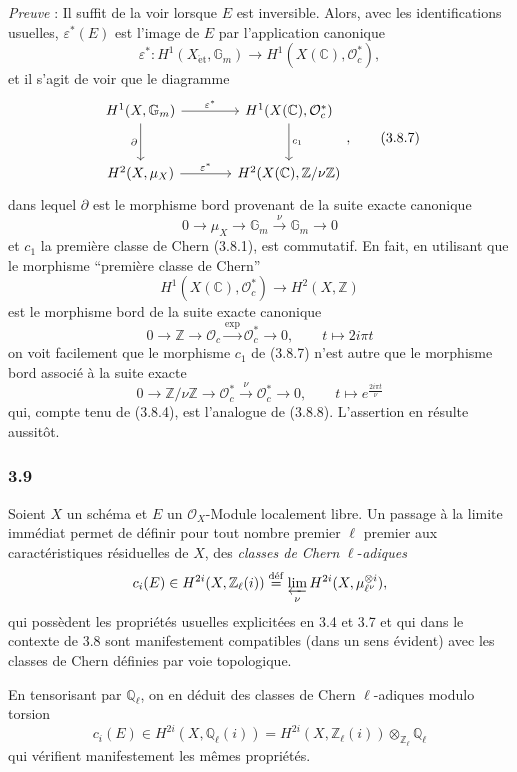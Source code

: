 \documentclass[11pt]{article}
\providecommand{\et}{\mathrm{\acute{e}t}}
\providecommand{\et}{\acute{e}t}
\begin{document}
\emph{Preuve} : Il suffit de la voir lorsque $E$ est inversible. Alors, avec les identifications usuelles, $\varepsilon^*(E)$ est l'image de $E$ par l'application canonique
\[
\varepsilon^*:H^1(X_{\et},\mathbb G_m)\to H^1(X(\mathbb C),\mathcal O_c^*),
\tag{3.8.6}
\]
et il s'agit de voir que le diagramme
\[
\begin{tikzcd}[column sep=large,row sep=large]
H^1(X,\mathbb G_m) \arrow[r,"\varepsilon^*"] \arrow[d,"\partial"'] &
H^1(X(\mathbb C),\mathcal O_c^*) \arrow[d,"c_1"]\\
H^2(X,\mu_X) \arrow[r,"\varepsilon^*"] &
H^2(X(\mathbb C),\mathbb Z/\nu\mathbb Z)
\end{tikzcd},
\tag{3.8.7}
\]
dans lequel $\partial$ est le morphisme bord provenant de la suite exacte canonique
\[
0\to \mu_X\to\mathbb G_m\xrightarrow{\nu}\mathbb G_m\to0
\tag{3.8.8}
\]
et $c_1$ la première classe de Chern (3.8.1), est commutatif. En fait, en utilisant que le morphisme ``première classe de Chern''
\[
H^1(X(\mathbb C),\mathcal O_c^*)\to H^2(X,\mathbb Z)
\]
est le morphisme bord de la suite exacte canonique
\[
0\to\mathbb Z\to\mathcal O_c\xrightarrow{\exp}\mathcal O_c^*\to0,
\qquad
t\mapsto 2i\pi t
\]
on voit facilement que le morphisme $c_1$ de (3.8.7) n'est autre que le morphisme bord associé à la suite exacte
\[
0\to\mathbb Z/\nu\mathbb Z\to\mathcal O_c^*\xrightarrow{\nu}\mathcal O_c^*\to0,
\qquad
t\mapsto e^{\frac{2i\pi t}{\nu}}
\]
qui, compte tenu de (3.8.4), est l'analogue de (3.8.8). L'assertion en résulte aussitôt.

\subsubsection*{3.9}
Soient $X$ un schéma et $E$ un $\mathcal O_X$-Module localement libre. Un passage à la limite immédiat permet de définir pour tout nombre premier $\ell$ premier aux caractéristiques résiduelles de $X$, des \emph{classes de Chern} $\ell$-\emph{adiques}
\[
c_i(E)\in H^{2i}(X,\mathbb Z_\ell(i))
\stackrel{\mathrm{d\acute{e}f}}{=}\varprojlim_\nu H^{2i}(X,\mu_{\ell^\nu}^{\otimes i}),
\]
qui
possèdent les propriétés usuelles explicitées en 3.4 et 3.7 et qui dans le contexte de 3.8 sont manifestement compatibles (dans un sens évident) avec les classes de Chern définies par voie topologique.

En tensorisant par $\mathbb Q_\ell$, on en déduit des classes de Chern $\ell$-adiques modulo torsion
\[
c_i(E)\in H^{2i}(X,\mathbb Q_\ell(i))
=H^{2i}(X,\mathbb Z_\ell(i))\otimes_{\mathbb Z_\ell}\mathbb Q_\ell
\]
qui vérifient manifestement les mêmes propriétés.
\end{document}
